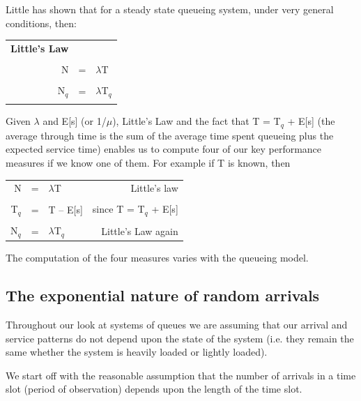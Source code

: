 \documentclass[12pt,fleqn]{report}
\begin{document}
Little has shown that for a steady state queueing system, under very
general conditions, then:

\begin{center}
\begin{tabular} { || r c l ||}
\hline
\multicolumn{1}{||l}{\bf Little's Law}     &&\\
   &   &            \\
\hspace*{1in} N  & = & $\lambda$T \hspace*{1in} \\
   &   &       \\
N$_q$  & = & $\lambda$T$_q$ \\
   &   &            \\
    \hline
\end{tabular}
\end{center}

\noindent
Given  $\lambda$ and E[s] (or 1/$\mu$), Little's Law
and the fact that T = T$_q$ + E[s] (the average 
through time is the sum of the average time spent queueing plus 
the expected  service time) enables us
to compute four of our key performance measures if we know one of
them. For example if T is known, then

    
\begin{tabular}{ r c l r }
N      & = &  $\lambda$T & Little's law \\
&&&\\
T$_q$  & = & T -- E[s]  & since T = T$_q$ + E[s] \\
&&&\\
N$_q$  & = & $\lambda$T$_q$ & Little's Law again\\
\end{tabular}

\noindent
The computation of the four measures varies with the queueing model.

\subsection{The exponential nature of random arrivals}

Throughout our look at systems of queues we are assuming that
our arrival and service patterns do not depend upon
the state of the system (i.e. they remain the same whether the system
is heavily loaded or lightly loaded).

We start off with the reasonable assumption that the number of
arrivals in a time slot (period of observation) 
depends upon the length of the time slot.
 
\end{document}

